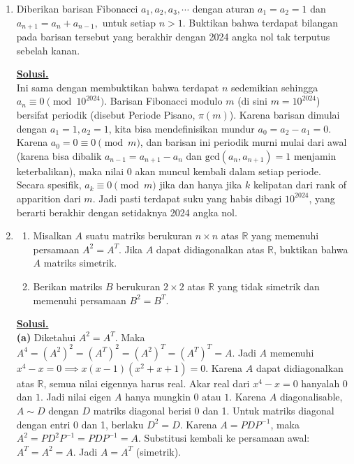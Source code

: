 \documentclass[12pt,twoside]{article}
\newenvironment{solution}
{
	\par\noindent\textbf{\underline{Solusi.}}\\
}
{
	\par
}
\begin{document}
\begin{enumerate}
\begin{solution}
          Himpunan $S$ memiliki titik limit dalam domain $\mathbb{C}$ (semua titik real adalah titik limit).
          Berdasarkan Teorema Identitas untuk fungsi analitik, jika dua fungsi analitik bernilai sama pada himpunan yang memiliki titik limit di domain, maka kedua fungsi tersebut identik pada seluruh domain.
          Jadi $f(z) = g(z) = e^z$ untuk setiap $z \in \mathbb{C}$.
        \end{solution}
  \item Diberikan barisan Fibonacci $a_1,a_2,a_3,\cdots$ dengan aturan $a_1=a_2=1$ dan $a_{n+1}=a_n+a_{n-1},$ untuk setiap $n>1$.
        Buktikan bahwa terdapat bilangan pada barisan tersebut yang berakhir dengan 2024 angka nol tak terputus sebelah kanan.
        \begin{solution}
          Ini sama dengan membuktikan bahwa terdapat $n$ sedemikian sehingga $a_n \equiv 0 \pmod{10^{2024}}$.
          Barisan Fibonacci modulo $m$ (di sini $m=10^{2024}$) bersifat periodik (disebut Periode Pisano, $\pi(m)$).
          Karena barisan dimulai dengan $a_1=1, a_2=1$, kita bisa mendefinisikan mundur $a_0 = a_2 - a_1 = 0$.
          Karena $a_0 = 0 \equiv 0 \pmod m$, dan barisan ini periodik murni mulai dari awal (karena bisa dibalik $a_{n-1} = a_{n+1} - a_n$ dan $\text{gcd}(a_n, a_{n+1}) = 1$ menjamin keterbalikan), maka nilai $0$ akan muncul kembali dalam setiap periode.
          Secara spesifik, $a_k \equiv 0 \pmod m$ jika dan hanya jika $k$ kelipatan dari rank of apparition dari $m$.
          Jadi pasti terdapat suku yang habis dibagi $10^{2024}$, yang berarti berakhir dengan setidaknya 2024 angka nol.
        \end{solution}
  \item
        \begin{enumerate}
          \item Misalkan $A$ suatu matriks berukuran $n\times n$ atas $\mathbb{R}$ yang memenuhi persamaan $A^2=A^T$. Jika $A$ dapat didiagonalkan atas $\mathbb{R}$, buktikan bahwa $A$ matriks simetrik.
          \item Berikan matriks $B$ berukuran $2\times 2$ atas $\mathbb{R}$ yang tidak simetrik dan memenuhi persamaan $B^2=B^T$.
        \end{enumerate}
        \begin{solution}
          \textbf{(a)} Diketahui $A^2 = A^T$.
          Maka $A^4 = (A^2)^2 = (A^T)^2 = (A^2)^T = (A^T)^T = A$.
          Jadi $A$ memenuhi $x^4 - x = 0 \implies x(x-1)(x^2+x+1) = 0$.
          Karena $A$ dapat didiagonalkan atas $\mathbb{R}$, semua nilai eigennya harus real.
          Akar real dari $x^4-x=0$ hanyalah $0$ dan $1$.
          Jadi nilai eigen $A$ hanya mungkin $0$ atau $1$.
          Karena $A$ diagonalisable, $A \sim D$ dengan $D$ matriks diagonal berisi 0 dan 1.
          Untuk matriks diagonal dengan entri 0 dan 1, berlaku $D^2 = D$.
          Karena $A = PDP^{-1}$, maka $A^2 = PD^2P^{-1} = PDP^{-1} = A$.
          Substitusi kembali ke persamaan awal: $A^T = A^2 = A$.
          Jadi $A = A^T$ (simetrik).


\end{solution}
\end{enumerate}
\end{document}

